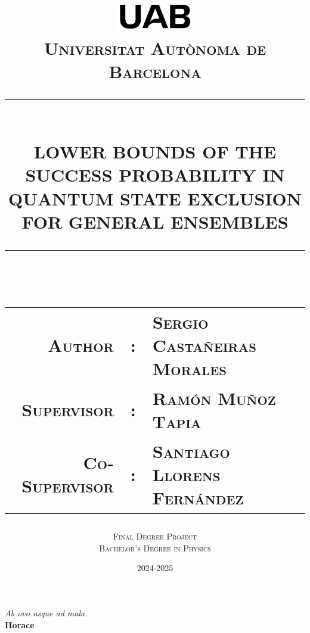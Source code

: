 \documentclass[12pt,letterpaper]{article}
\newcommand{\HRule}[1]{\rule{\linewidth}{#1}}
\newcommand\subject{Final Degree Project}
\newcommand\degree{Bachelor's Degree in Physics}
\newcommand\documenttitle{Lower bounds of the success probability in quantum state exclusion for general ensembles}
\newcommand\NetIDb{Universitat Autònoma de Barcelona}
\newcommand\AuthorName{Sergio Castañeiras Morales}
\begin{document}
\title{\vspace{4cm} \normalsize 
		\includegraphics[width = 0.25\textwidth]{GeneralSources/UABLogo.png}\\ [0.5cm]
		\textsc{\NetIDb}\\ [2.0cm]
		\HRule{0.5pt} \\
		\LARGE \textbf{\uppercase{\documenttitle}}
		\HRule{2pt} \\ [1.5cm]
		\normalsize \begin{tabular}{rcl}  %
        \textsc{Author} & : & \textsc{\AuthorName} \\
        \textsc{Supervisor} & : & \textsc{Ramón Muñoz Tapia} \\
        \textsc{Co-Supervisor} & : & \textsc{Santiago Llorens Fernández}
    \end{tabular}
    \normalsize \vspace*{5\baselineskip}
		}

\date{2024-2025}

\author{\large \textsc{\subject} \\ \textsc{\degree}}



\begin{titlepage}
\clearpage\maketitle
\thispagestyle{empty}
\end{titlepage}

\thispagestyle{empty}
\mbox{} 
\newpage
\thispagestyle{empty}
\vspace*{\fill} %
\begin{flushright}
    \emph{Ab ovo usque ad mala.}\\[1em]
    \textbf{Horace}
\end{flushright}
\vspace*{\fill} 
\newpage
\thispagestyle{empty}
\mbox{} 
\newpage
\end{document}
